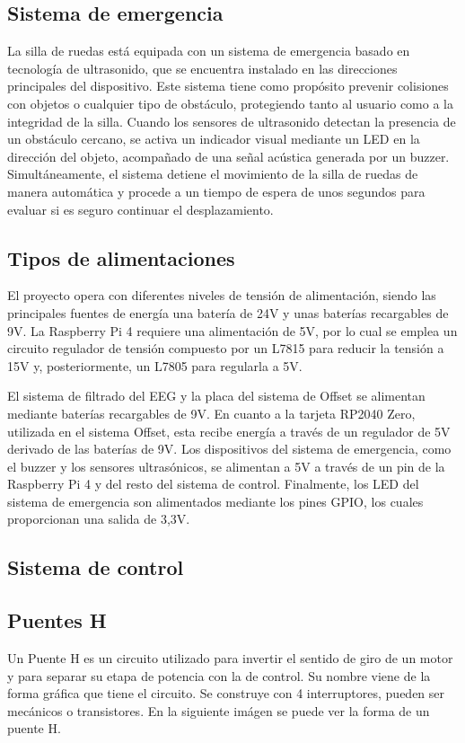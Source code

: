 \documentclass{article}
\begin{document}
\subsection{Sistema de emergencia}

La silla de ruedas está equipada con un sistema de emergencia basado en tecnología de ultrasonido, que se encuentra instalado en las direcciones principales del dispositivo. Este sistema tiene como propósito prevenir colisiones con objetos o cualquier tipo de obstáculo, protegiendo tanto al usuario como a la integridad de la silla. Cuando los sensores de ultrasonido detectan la presencia de un obstáculo cercano, se activa un indicador visual mediante un LED en la dirección del objeto, acompañado de una señal acústica generada por un buzzer. Simultáneamente, el sistema detiene el movimiento de la silla de ruedas de manera automática y procede a un tiempo de espera de unos segundos para evaluar si es seguro continuar el desplazamiento.

\subsection{Tipos de alimentaciones}

El proyecto opera con diferentes niveles de tensión de alimentación, siendo las principales fuentes de energía una batería de 24V y unas baterías recargables de 9V. La Raspberry Pi 4 requiere una alimentación de 5V, por lo cual se emplea un circuito regulador de tensión compuesto por un L7815 para reducir la tensión a 15V y, posteriormente, un L7805 para regularla a 5V.

El sistema de filtrado del EEG y la placa del sistema de Offset se alimentan mediante baterías recargables de 9V. En cuanto a la tarjeta RP2040 Zero, utilizada en el sistema Offset, esta recibe energía a través de un regulador de 5V derivado de las baterías de 9V. Los dispositivos del sistema de emergencia, como el buzzer y los sensores ultrasónicos, se alimentan a 5V a través de un pin de la Raspberry Pi 4 y del resto del sistema de control. Finalmente, los LED del sistema de emergencia son alimentados mediante los pines GPIO, los cuales proporcionan una salida de 3,3V.

\subsection{Sistema de control}

\subsection{Puentes H}
Un Puente H es un circuito utilizado para invertir el sentido de giro de un motor y para separar su etapa de potencia con la de control. Su nombre viene de la forma gráfica que tiene el circuito. Se construye con 4 interruptores, pueden ser mecánicos o transistores. En la siguiente imágen se puede ver la forma de un puente H.
\end{document}
